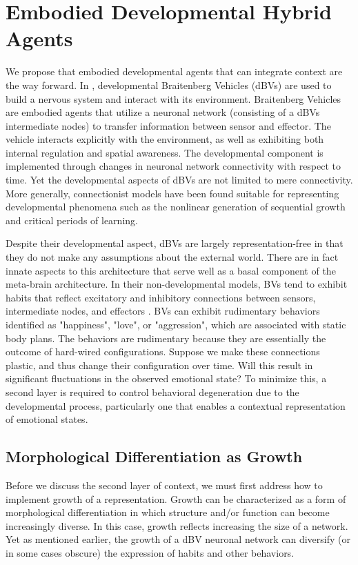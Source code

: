 \documentclass[letterpaper]{article}
\begin{document}
\section{Embodied Developmental Hybrid Agents}
We propose that embodied developmental agents that can integrate context are the way forward. In \citep{[5]}, developmental Braitenberg Vehicles (dBVs) are used to build a nervous system and interact with its environment. Braitenberg Vehicles \citep{[6]} are embodied agents that utilize a neuronal network (consisting of a dBVs intermediate nodes) to transfer information between sensor and effector. The vehicle interacts explicitly with the environment, as well as exhibiting both internal regulation and spatial awareness. The developmental component is implemented through changes in neuronal network connectivity with respect to time. Yet the developmental aspects of dBVs are not limited to mere connectivity. More generally, connectionist models \citep{[7]} have been found suitable for representing developmental phenomena such as the nonlinear generation of sequential growth and critical periods of learning.

Despite their developmental aspect, dBVs are largely representation-free in that they do not make any assumptions about the external world. There are in fact innate aspects to this architecture that serve well as a basal component of the meta-brain architecture. In their non-developmental models, BVs tend to exhibit habits that reflect excitatory and inhibitory connections between sensors, intermediate nodes, and effectors \citep{[8]}. BVs can exhibit rudimentary behaviors identified as "happiness", "love", or "aggression", which are associated with static body plans. The behaviors are rudimentary because they are essentially the outcome of hard-wired configurations. Suppose we make these connections plastic, and thus change their configuration over time. Will this result in significant fluctuations in the observed emotional state? To minimize this, a second layer is required to control behavioral degeneration due to the developmental process, particularly one that enables a contextual representation of emotional states.

\subsection{Morphological Differentiation as Growth}
Before we discuss the second layer of context, we must first address how to implement growth of a representation. Growth can be characterized as a form of morphological differentiation in which structure and/or function can become increasingly diverse. In this case, growth reflects increasing the size of a network. Yet as mentioned earlier, the growth of a dBV neuronal network can diversify (or in some cases obscure) the expression of habits and other behaviors. 
\end{document}
